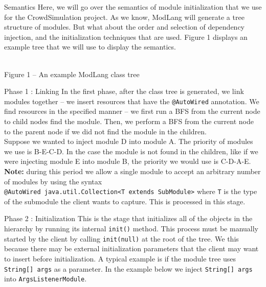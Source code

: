 \documentclass[11pt]{article}
\begin{document}
\begin{section}{Semantics}
Here, we will go over the semantics of module initialization that we use for the CrowdSimulation project. As we know, ModLang will generate a tree structure of modules. But what about the order and selection of dependency injection, and the initialization techniques that are used. Figure 1 displays an example tree that we will use to display the semantics.

\begin{center}
\\
Figure 1 -- An example ModLang class tree
\end{center}

\begin{subsection}{Phase 1 : Linking}
In the first phase, after the class tree is generated, we link modules together -- we insert resources that have the \verb|@AutoWired| annotation. We find resources in the specified manner -- we first run a BFS from the current node to child nodes find the module. Then, we perform a BFS from the current node to the parent node if we did not find the module in the children.\\

Suppose we wanted to inject module D into module A. The priority of modules we use is B-E-C-D. In the case the module is not found in the children, like if we were injecting module E into module B, the priority we would use is C-D-A-E.\\

\textbf{Note:} during this period we allow a single module to accept an arbitrary number of modules by using the syntax \\\verb|@AutoWired java.util.Collection<T extends SubModule>| where \verb|T| is the type of the submodule the client wants to capture. This is processed in this stage.
\end{subsection}

\begin{subsection}{Phase 2 : Initialization}
This is the stage that initializes all of the objects in the hierarchy by running its internal \verb|init()| method. This process must be manually started by the client by calling \verb|init(null)| at the root of the tree. We this because there may be external initialization parameters that the client may want to insert before initialization. A typical example is if the module tree uses \verb|String[] args| as a parameter. In the example below we inject \verb|String[] args| into \verb|ArgsListenerModule|.


\end{subsection}
\end{section}
\end{document}
